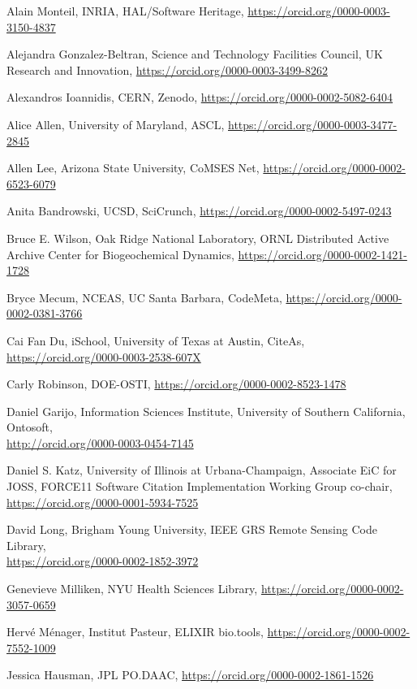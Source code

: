 \documentclass[11pt]{article}
\begin{document}
\begin{spacing}{0.86}

Alain Monteil, INRIA, HAL/Software Heritage,
\url{https://orcid.org/0000-0003-3150-4837}

Alejandra Gonzalez-Beltran, Science and Technology Facilities Council,
UK Research and Innovation,
\url{https://orcid.org/0000-0003-3499-8262}

Alexandros Ioannidis, CERN, Zenodo,
\url{https://orcid.org/0000-0002-5082-6404}

Alice Allen, University of Maryland, ASCL,
\url{https://orcid.org/0000-0003-3477-2845}

Allen Lee, Arizona State University, CoMSES Net,
\url{https://orcid.org/0000-0002-6523-6079}

Anita Bandrowski, UCSD, SciCrunch,
\url{https://orcid.org/0000-0002-5497-0243}

Bruce E. Wilson, Oak Ridge National Laboratory, ORNL Distributed Active
Archive Center for Biogeochemical Dynamics,
\url{https://orcid.org/0000-0002-1421-1728}

Bryce Mecum, NCEAS, UC Santa Barbara, CodeMeta,
\url{https://orcid.org/0000-0002-0381-3766}

Cai Fan Du, iSchool, University of Texas at Austin, CiteAs,
\url{https://orcid.org/0000-0003-2538-607X}

Carly Robinson, DOE-OSTI,
\url{https://orcid.org/0000-0002-8523-1478}

Daniel Garijo, Information Sciences Institute, University of Southern
California, Ontosoft,\\
\url{http://orcid.org/0000-0003-0454-7145}

Daniel S. Katz, University of Illinois at Urbana-Champaign, Associate
EiC for JOSS, FORCE11 Software Citation Implementation Working Group
co-chair,
\url{https://orcid.org/0000-0001-5934-7525}

David Long, Brigham Young University, IEEE GRS Remote Sensing Code
Library,\\
\url{https://orcid.org/0000-0002-1852-3972}

Genevieve Milliken, NYU Health Sciences Library,
\url{https://orcid.org/0000-0002-3057-0659}

Hervé Ménager, Institut Pasteur, ELIXIR bio.tools,
\url{https://orcid.org/0000-0002-7552-1009}

Jessica Hausman, JPL PO.DAAC,
\url{https://orcid.org/0000-0002-1861-1526}


\end{spacing}
\end{document}
